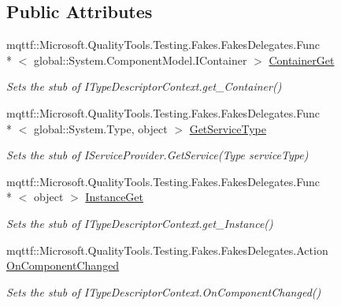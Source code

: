 \subsection*{Public Attributes}
\begin{DoxyCompactItemize}
\item 
mqttf\-::\-Microsoft.\-Quality\-Tools.\-Testing.\-Fakes.\-Fakes\-Delegates.\-Func\\*
$<$ global\-::\-System.\-Component\-Model.\-I\-Container $>$ \hyperlink{class_system_1_1_component_model_1_1_fakes_1_1_stub_i_type_descriptor_context_ab3baf1e5f8c8cb4ca335be2976aa835f}{Container\-Get}
\begin{DoxyCompactList}\small\item\em Sets the stub of I\-Type\-Descriptor\-Context.\-get\-\_\-\-Container()\end{DoxyCompactList}\item 
mqttf\-::\-Microsoft.\-Quality\-Tools.\-Testing.\-Fakes.\-Fakes\-Delegates.\-Func\\*
$<$ global\-::\-System.\-Type, object $>$ \hyperlink{class_system_1_1_component_model_1_1_fakes_1_1_stub_i_type_descriptor_context_a0f90652f874769ebbfdc17c2c2a11f36}{Get\-Service\-Type}
\begin{DoxyCompactList}\small\item\em Sets the stub of I\-Service\-Provider.\-Get\-Service(\-Type service\-Type)\end{DoxyCompactList}\item 
mqttf\-::\-Microsoft.\-Quality\-Tools.\-Testing.\-Fakes.\-Fakes\-Delegates.\-Func\\*
$<$ object $>$ \hyperlink{class_system_1_1_component_model_1_1_fakes_1_1_stub_i_type_descriptor_context_a31e60575ca71eafac2d1db107728afcb}{Instance\-Get}
\begin{DoxyCompactList}\small\item\em Sets the stub of I\-Type\-Descriptor\-Context.\-get\-\_\-\-Instance()\end{DoxyCompactList}\item 
mqttf\-::\-Microsoft.\-Quality\-Tools.\-Testing.\-Fakes.\-Fakes\-Delegates.\-Action \hyperlink{class_system_1_1_component_model_1_1_fakes_1_1_stub_i_type_descriptor_context_a89dba6a2919e4ef62d1ae94cfbffc824}{On\-Component\-Changed}
\begin{DoxyCompactList}\small\item\em Sets the stub of I\-Type\-Descriptor\-Context.\-On\-Component\-Changed()\end{DoxyCompactList}\item 

\end{DoxyCompactItemize}
